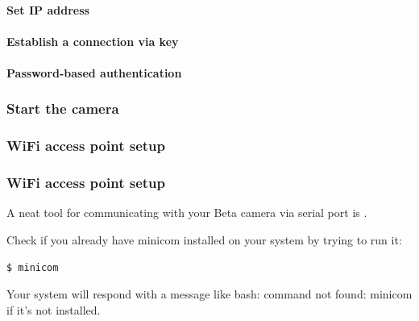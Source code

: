 \paragraph{Set IP address}
\paragraph{Establish a connection via key}
\paragraph{Password-based authentication}
\subsubsection{Start the camera}
\subsubsection{WiFi access point setup}

\subsubsection{WiFi access point setup}

A neat tool for communicating with your Beta camera via serial port is .

Check if you already have minicom installed on your system by trying to run it:

\begin{lstlisting}[language=bash,morekeywords=$,keywordstyle=\bfseries,frame=none,xleftmargin=.25in,belowskip=2em, aboveskip=2em]
$ minicom
\end{lstlisting}
Your system will respond with a message like bash: command not found: minicom if it's not installed.
